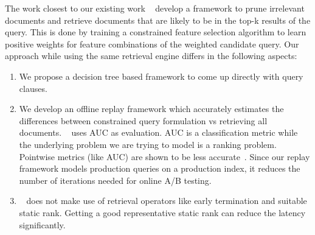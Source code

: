The work closest to our existing work ~\cite{borisyuk2016casmos} develop a
framework to prune irrelevant documents and retrieve documents that are likely
to be in the top-k results of the query. This is done by training a constrained
feature selection algorithm to learn positive weights for feature combinations
of the weighted candidate query. Our approach while using the same retrieval
engine differs in the following aspects:
\begin{enumerate}
        \item We propose a decision tree based framework to come up directly
            with query clauses. 
        \item We develop an offline replay framework which accurately estimates
            the differences between constrained query formulation vs retrieving
            all documents. ~\cite{borisyuk2016casmos} uses AUC as evaluation.
            AUC is a classification metric while the underlying problem we are
            trying to model is a ranking problem. Pointwise metrics (like AUC)
            are shown to be less accurate~\cite{xia2008listwise,
            liu2009learning}. Since our replay framework models production
            queries on a production index, it reduces the number of iterations
            needed for online A/B testing.
        \item ~\cite{borisyuk2016casmos} does not make use of retrieval
            operators like early termination and suitable static rank. Getting
            a good representative static rank can reduce the latency
            significantly.
\end{enumerate}
